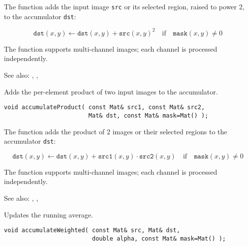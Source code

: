 The function adds the input image \texttt{src} or its selected region, raised to power 2, to the accumulator \texttt{dst}:

\[ \texttt{dst}(x,y) \leftarrow \texttt{dst}(x,y) + \texttt{src}(x,y)^2 \quad \text{if} \quad \texttt{mask}(x,y) \ne 0 \]

The function supports multi-channel images; each channel is processed independently.

See also: , , 

Adds the per-element product of two input images to the accumulator.

\begin{lstlisting}
void accumulateProduct( const Mat& src1, const Mat& src2,
                        Mat& dst, const Mat& mask=Mat() );
\end{lstlisting}
\begin{description}
\end{description}

The function adds the product of 2 images or their selected regions to the accumulator \texttt{dst}:

\[ \texttt{dst}(x,y) \leftarrow \texttt{dst}(x,y) + \texttt{src1}(x,y) \cdot \texttt{src2}(x,y) \quad \text{if} \quad \texttt{mask}(x,y) \ne 0 \]

The function supports multi-channel images; each channel is processed independently.

See also: , , 

Updates the running average.

\begin{lstlisting}
void accumulateWeighted( const Mat& src, Mat& dst,
                         double alpha, const Mat& mask=Mat() );
\end{lstlisting}
\begin{description}
\end{description}

